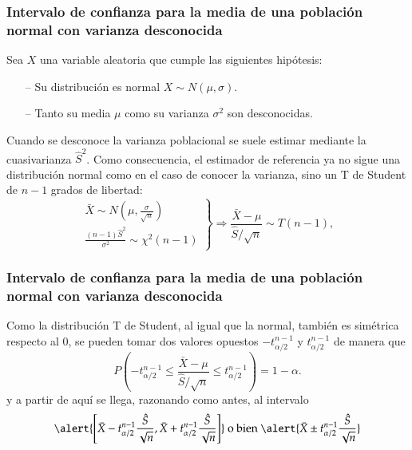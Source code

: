 \begin{frame}
\frametitle{Intervalo de confianza para la media de una población normal con varianza desconocida}
Sea $X$ una variable aleatoria que cumple las siguientes hipótesis:
\begin{itemize}
\item[--] Su distribución es normal $X\sim N(\mu,\sigma)$.
\item[--] Tanto su media $\mu$ como su varianza $\sigma^2$ son desconocidas.
\end{itemize}

Cuando se desconoce la varianza poblacional se suele estimar mediante la cuasivarianza $\hat{S}^2$.
Como consecuencia, el estimador de referencia ya no sigue una distribución normal como en el caso de conocer la varianza, sino un T de Student de $n-1$ grados de libertad:
\[
\left.
\begin{array}{l}
\bar X \sim N\left(\mu,\frac{\sigma}{\sqrt{n}}\right)\\
\displaystyle\frac{(n-1)\hat{S}^2}{\sigma^2}\sim \chi^2(n-1)
\end{array}
\right\}
\Rightarrow 
\frac{\bar X -\mu}{\hat{S}/\sqrt{n}}\sim T(n-1),
\]
\end{frame}


\begin{frame}
\frametitle{Intervalo de confianza para la media de una población normal con varianza desconocida}
Como la distribución T de Student, al igual que la normal, también es simétrica respecto al 0, se pueden tomar dos valores opuestos $-t^{n-1}_{\alpha/2}$ y $t^{n-1}_{\alpha/2}$ de manera que
\[
P\left(-t^{n-1}_{\alpha/2}\leq \frac{\bar X -\mu}{\hat{S}/\sqrt{n}} \leq t^{n-1}_{\alpha/2}\right) = 1-\alpha.
\]
y a partir de aquí se llega, razonando como antes, al intervalo
\[
\alert{\left[\bar{X}-t^{n-1}_{\alpha/2}\frac{\hat{S}}{\sqrt{n}},\bar{X}+t^{n-1}_{\alpha/2}\frac{\hat{S}}{\sqrt{n}}\right]}
\mbox{ o bien }
\alert{\bar{X}\pm t^{n-1}_{\alpha/2}\frac{\hat{S}}{\sqrt{n}}}
\]
\end{frame}


